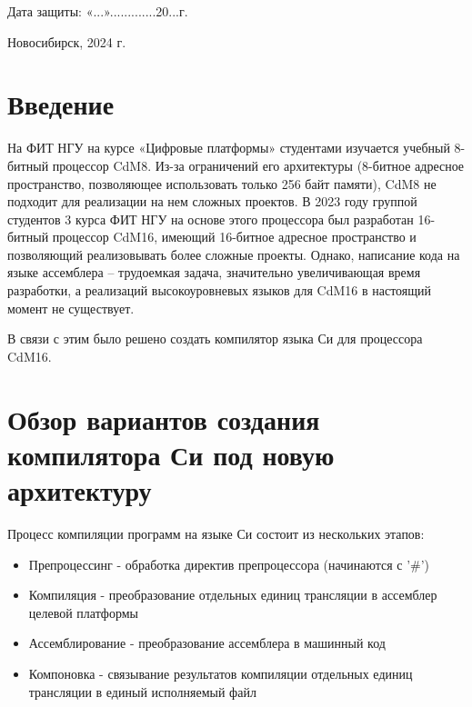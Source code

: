 \documentclass[a4paper,14pt]{extarticle}
\begin{document}
\begin{titlepage}
\begin{tabular*}{\textwidth}{l @{\hskip 4cm} l}
	\end{tabular*}
	\vfill
	\hfill
	\begin{minipage}{0.5\textwidth}
		Дата защиты: «...».............20...г.
	\end{minipage}
	
	\vfill
	
	\begin{center}
		Новосибирск, 2024 г.
	\end{center}
\end{titlepage}
	
	

\tableofcontents

\pagebreak

\section{Введение}

На ФИТ НГУ на курсе «Цифровые платформы» студентами изучается учебный 8-битный процессор CdM8. Из-за ограничений его архитектуры (8-битное адресное пространство, позволяющее использовать только 256 байт памяти), CdM8 не подходит для реализации на нем сложных проектов. В 2023 году группой студентов 3 курса ФИТ НГУ на основе этого процессора был разработан 16-битный процессор CdM16, имеющий 16-битное адресное пространство и позволяющий реализовывать более сложные проекты. Однако, написание кода на языке ассемблера – трудоемкая задача, значительно увеличивающая время разработки, а реализаций высокоуровневых языков для CdM16 в настоящий момент не существует.

В связи с этим было решено создать компилятор языка Си для процессора CdM16.

\pagebreak
\section{Обзор вариантов создания компилятора Си под новую архитектуру}

Процесс компиляции программ на языке Си состоит из нескольких этапов:
\begin{itemize}
	\item Препроцессинг - обработка директив препроцессора (начинаются с '\#')
	\item Компиляция - преобразование отдельных единиц трансляции в ассемблер целевой платформы
	\item Ассемблирование - преобразование ассемблера в машинный код
	\item Компоновка - связывание результатов компиляции отдельных единиц трансляции в единый исполняемый файл
\end{itemize}
\end{document}
